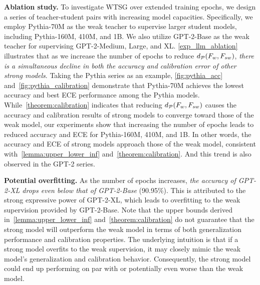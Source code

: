 \noindent \textbf{Ablation study.}
To investigate WTSG over extended training epochs, we design a series of teacher-student pairs with increasing model capacities. 
Specifically, we employ Pythia-70M as the weak teacher to supervise larger student models, including Pythia-160M, 410M, and 1B. 
We also utilize GPT-2-Base as the weak teacher for supervising GPT-2-Medium, Large, and XL.
\cref{exp_llm_ablation} illustrates that as we increase the number of epochs to reduce $d_\mathcal{P}(F_w, F_{sw})$, \textit{there is a simultaneous decline in both the accuracy and calibration error of other strong models}.
Taking the Pythia series as an example, \cref{fig:pythia_acc} and~\cref{fig:pythia_calibration} demonstrate that Pythia-70M achieves the lowest accuracy and best ECE performance among the Pythia models. While~\cref{theorem:calibration} indicates that reducing $d_\mathcal{P}(F_w, F_{sw})$ causes the accuracy and calibration results of strong models to converge toward those of the weak model, 
our experiments show that increasing the number of epochs leads to reduced accuracy and ECE for Pythia-160M, 410M, and 1B.
In other words, the accuracy and ECE of strong models approach those of the weak model, consistent with~\cref{lemma:upper_lower_inf} and~\cref{theorem:calibration}. 
And this trend is also observed in the GPT-2 series.

\noindent \textbf{Potential overfitting.}
As the number of epochs increases, \textit{the accuracy of GPT-2-XL drops even below that of GPT-2-Base} (90.95\%). 
This is attributed to the strong expressive power of GPT-2-XL, which leads to overfitting to the weak supervision provided by GPT-2-Base.
Note that the upper bounds derived in~\cref{lemma:upper_lower_inf} and~\cref{theorem:calibration} do not guarantee that the strong model will outperform the weak model in terms of both generalization performance and calibration properties.
The underlying intuition is that if a strong model overfits to the weak supervision, it may closely mimic the weak model's generalization and calibration behavior. 
Consequently, the strong model could end up performing on par with or potentially even worse than the weak model.
















